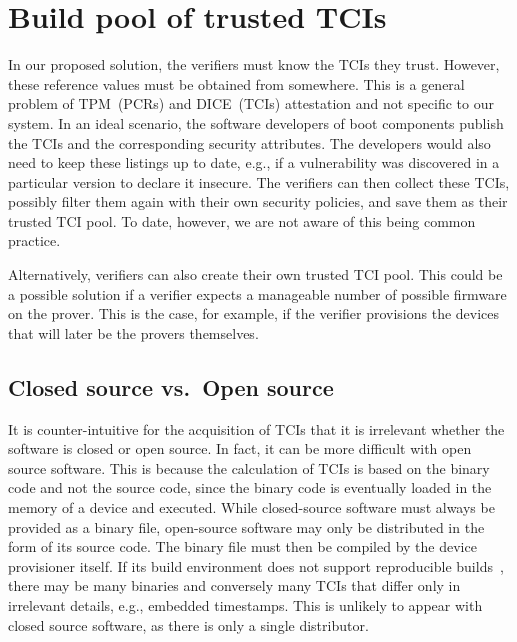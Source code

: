 \section{Build pool of trusted TCIs}

In our proposed solution, the verifiers must know the TCIs they trust.
However, these reference values must be obtained from somewhere.
This is a general problem of TPM~(PCRs) and DICE~(TCIs) attestation and not specific to our system.
In an ideal scenario, the software developers of boot components publish the TCIs and the corresponding security attributes.
The developers would also need to keep these listings up to date, e.g., if a vulnerability was discovered in a particular version to declare it insecure.
The verifiers can then collect these TCIs, possibly filter them again with their own security policies, and save them as their trusted TCI pool.
To date, however, we are not aware of this being common practice.

Alternatively, verifiers can also create their own trusted TCI pool.
This could be a possible solution if a verifier expects a manageable number of possible firmware on the prover.
This is the case, for example, if the verifier provisions the devices that will later be the provers themselves.

\subsection{Closed source vs.\ Open source}

It is counter-intuitive for the acquisition of TCIs that it is irrelevant whether the software is closed or open source.
In fact, it can be more difficult with open source software.
This is because the calculation of TCIs is based on the binary code and not the source code, since the binary code is eventually loaded in the memory of a device and executed.
While closed-source software must always be provided as a binary file, open-source software may only be distributed in the form of its source code.
The binary file must then be compiled by the device provisioner itself.
If its build environment does not support reproducible builds~\cite{Lamb2022}, there may be many binaries and conversely many TCIs that differ only in irrelevant details, e.g., embedded timestamps.
This is unlikely to appear with closed source software, as there is only a single distributor.

